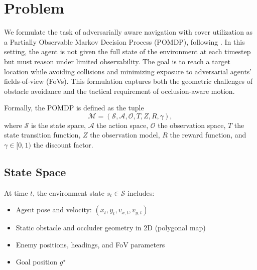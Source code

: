 \documentclass[letterpaper, 10 pt, conference]{ieeeconf}
\begin{document}

\section{Problem}
We formulate the task of adversarially aware navigation with cover utilization as a Partially Observable Markov Decision Process (POMDP), following \cite{esslinger2022deep,KAELBLING199899}. In this setting, the agent is not given the full state of the environment at each timestep but must reason under limited observability. The goal is to reach a target location while avoiding collisions and minimizing exposure to adversarial agents’ fields-of-view (FoVs). This formulation captures both the geometric challenges of obstacle avoidance and the tactical requirement of occlusion-aware motion.

Formally, the POMDP is defined as the tuple
\[
\mathcal{M} = (\mathcal{S}, \mathcal{A}, \mathcal{O}, T, Z, R, \gamma),
\]
where $\mathcal{S}$ is the state space, $\mathcal{A}$ the action space, $\mathcal{O}$ the observation space, $T$ the state transition function, $Z$ the observation model, $R$ the reward function, and $\gamma \in [0,1)$ the discount factor.

\subsection{State Space}
At time $t$, the environment state $s_t \in \mathcal{S}$ includes:
\begin{itemize}
    \item Agent pose and velocity: $(x_t, y_t, v_{x,t}, v_{y,t})$
    \item Static obstacle and occluder geometry in 2D (polygonal map)
    \item Enemy positions, headings, and FoV parameters
    \item Goal position $g^\star$
\end{itemize}
\end{document}

